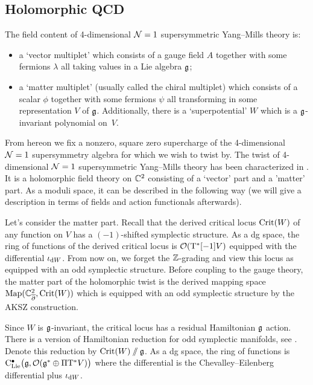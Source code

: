 \documentclass[11pt]{amsart}
\begin{document}
\subsection{Holomorphic QCD}

The field content of 4-dimensional $\mathcal N=1$ supersymmetric Yang--Mills theory is:
\begin{itemize}
\item a `vector multiplet' which consists of a gauge field $A$ together with some fermions $\lambda$ all taking values in a Lie algebra $\mathfrak g$;
\item a `matter multiplet' (usually called the chiral multiplet) which consists of a scalar $\phi$ together with some fermions $\psi$ all transforming in some representation $V$ of $\mathfrak g$. 
Additionally, there is a `superpotential' $W$ which is a $\mathfrak g$-invariant polynomial on~$V$. 
\end{itemize}

From hereon we fix a nonzero, square zero supercharge of the 4-dimensional $\mathcal N=1$ supersymmetry algebra for which we wish to twist by. 
The twist of 4-dimensional $\mathcal N=1$ supersymmetric Yang--Mills theory has been characterized in \cite{CosYangian, ESW, SWchar}. 
It is a holomorphic field theory on $\mathbb C^2$ consisting of a `vector' part and a 'matter' part.
As a moduli space, it can be described in the following way (we will give a description in terms of fields and action functionals afterwards).

Let's consider the matter part. 
Recall that the derived critical locus ${\rm Crit}(W)$ of any function on $V$ has a $(-1)$-shifted symplectic structure. 
As a dg space, the ring of functions of the derived critical locus is $\mathcal O({\rm T}^* [-1] V)$ equipped with the differential $\iota_{{\rm d} W}$. 
From now on, we forget the $\mathbb Z$-grading and view this locus as equipped with an odd symplectic structure. 
Before coupling to the gauge theory, the matter part of the holomorphic twist is the derived mapping space ${\rm Map}(\mathbb C^2_{{\overline{\partial}}}, {\rm Crit}(W))$ which is equipped with an odd symplectic structure by the AKSZ construction. 

Since $W$ is $\mathfrak g$-invariant, the critical locus has a residual Hamiltonian $\mathfrak g$ action. 
There is a version of Hamiltonian reduction for odd symplectic manifolds, see \cite{Pavel, Kevin, who else}. 
Denote this reduction by ${\rm Crit}(W) \sslash \mathfrak g$. 
As a dg space, the ring of functions is ${\rm C}_{{\rm Lie}}^\bullet\big(\mathfrak g , \mathcal O(\mathfrak g^* \oplus \Pi {\rm T}^* V) \big)$ where the differential is the Chevalley--Eilenberg differential plus $\iota_{{\rm d} W}$. 
\end{document}
